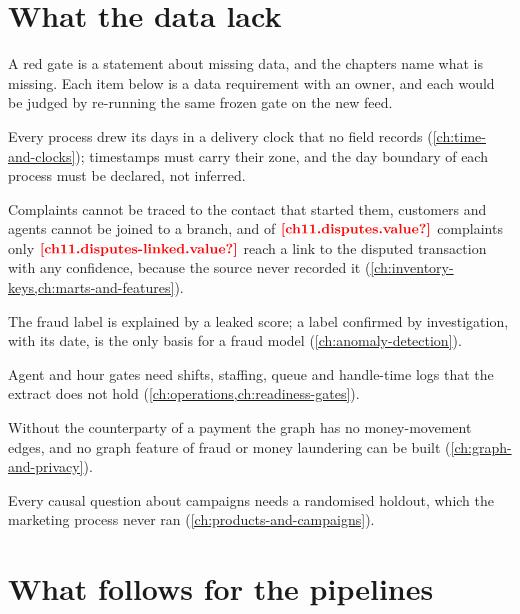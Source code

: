 \section{What the data lack}\label{sec:cc-lack}

A red gate is a statement about missing data, and the chapters name what is missing. Each item below is a data
requirement with an owner, and each would be judged by re-running the same frozen gate on the new feed.

\begin{description}[style=nextline]
  \item[Time with a declared clock] Every process drew its days in a delivery clock that no field records
  (\cref{ch:time-and-clocks}); timestamps must carry their zone, and the day boundary of each process must be
  declared, not inferred.
  \item[Keys that link what they claim to link] Complaints cannot be traced to the contact that started them, customers
  and agents cannot be joined to a branch, and of $\est{ch11.disputes}{value}$ complaints only
  $\est{ch11.disputes-linked}{value}$ reach a link to the disputed transaction with any confidence, because the source
  never recorded it (\cref{ch:inventory-keys,ch:marts-and-features}).
  \item[Confirmed labels] The fraud label is explained by a leaked score; a label confirmed by investigation, with its
  date, is the only basis for a fraud model (\cref{ch:anomaly-detection}).
  \item[Workforce, telephony and schedules] Agent and hour gates need shifts, staffing, queue and handle-time logs that
  the extract does not hold (\cref{ch:operations,ch:readiness-gates}).
  \item[Counterparties] Without the counterparty of a payment the graph has no money-movement edges, and no graph
  feature of fraud or money laundering can be built (\cref{ch:graph-and-privacy}).
  \item[Experiments] Every causal question about campaigns needs a randomised holdout, which the marketing process
  never ran (\cref{ch:products-and-campaigns}).
\end{description}

\section{What follows for the pipelines}\label{sec:cc-pipelines}

